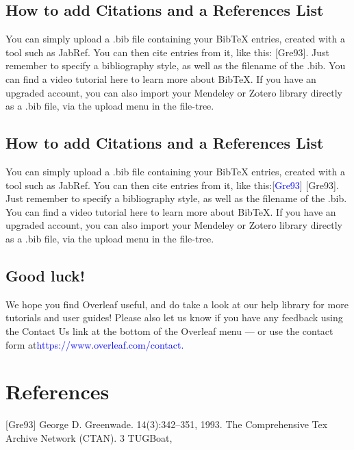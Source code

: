 \documentclass{article}
\begin{document}
   \subsection{How to add Citations and a References List}
   You can simply upload a .bib file containing your BibTeX entries, created with a tool such as JabRef.
   You can then cite entries from it, like this: [Gre93]. Just remember to specify a bibliography style, as
   well as the filename of the .bib. You can find a video tutorial here to learn more about BibTeX.
   If you have an upgraded account, you can also import your Mendeley or Zotero library directly as
   a .bib file, via the upload menu in the file-tree.
   \subsection{How to add Citations and a References List}
   You can simply upload a .bib file containing your BibTeX entries, created with a tool such as JabRef.
   You can then cite entries from it, like this:[\textcolor{blue}{Gre93}]  [Gre93]. Just remember to specify a bibliography style, as
   well as the filename of the .bib. You can find a video tutorial here to learn more about BibTeX.
   If you have an upgraded account, you can also import your Mendeley or Zotero library directly as
   a .bib file, via the upload menu in the file-tree.
   \subsection{Good luck!}
   We hope you find Overleaf useful, and do take a look at our help library for more tutorials and user
   guides! Please also let us know if you have any feedback using the Contact Us link at the bottom of
   the Overleaf menu — or use the contact form at\textcolor{blue}{https://www.overleaf.com/contact.} 
   \section {References}
   [Gre93] George D. Greenwade.
   14(3):342–351, 1993.
   The Comprehensive Tex Archive Network (CTAN).
   3
   TUGBoat,
\end{document}
